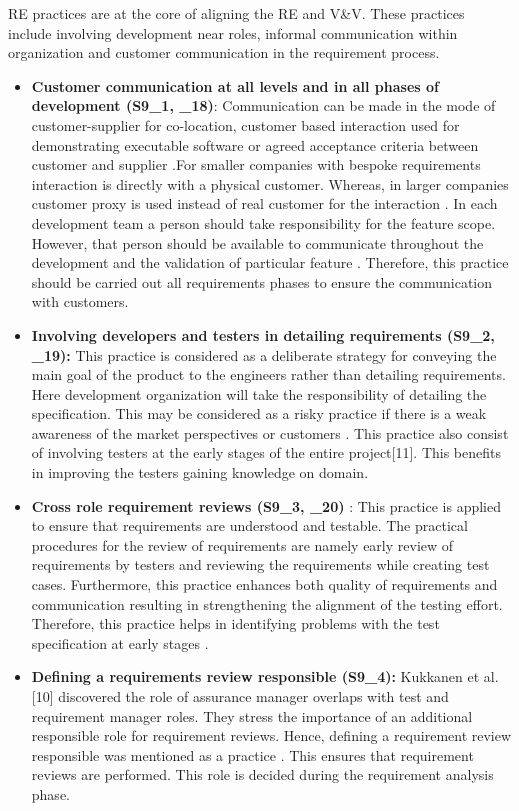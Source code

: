 \documentclass{article}
\begin{document}
RE practices are at the core of aligning the RE and V\&V\cite{bjarnason2014challenges}. These practices include involving development near roles, informal communication within organization and customer communication in the requirement process.

\begin{itemize}
    \item \textbf{Customer communication at all levels and in all phases of development (S9\_1, \cite{bjarnason2014alignment}\_18)}: Communication can be made in the mode of customer-supplier for co-location, customer based interaction used for demonstrating executable software or agreed acceptance criteria between customer and supplier \cite{bjarnason2014challenges}.For smaller companies with bespoke requirements interaction is directly with a physical customer. Whereas, in larger companies customer proxy is used instead of real customer for the interaction \cite{bjarnason2014challenges}. In each development team a person should take responsibility for the feature scope. However, that person should be available to communicate throughout the development and the validation of particular feature \cite{bjarnason2014challenges}. Therefore, this practice should be carried out all requirements phases to ensure the communication with customers.
    \item \textbf{Involving developers and testers in detailing requirements (S9\_2,  \cite{bjarnason2014alignment}\_19): }
    This practice is considered as a deliberate strategy for conveying the main goal of the product to the engineers rather than detailing requirements. Here development organization will take the responsibility of detailing the specification. This may be considered as a risky practice if there is a weak awareness of the market perspectives or customers \cite{bjarnason2014challenges}. This practice also consist of involving testers at the early stages of the entire project[11]. This benefits in improving the testers gaining knowledge on domain\cite{bjarnason2014challenges}. 
    \item \textbf{Cross role requirement reviews (S9\_3, \cite{bjarnason2014alignment}\_20)} : This practice is applied to ensure that requirements are understood and testable. The practical procedures for the review of requirements are namely early review of requirements by testers and reviewing the requirements while creating test cases. Furthermore, this practice enhances both quality of requirements and communication resulting in strengthening the alignment of the testing effort. Therefore, this practice helps in identifying problems with the test specification at early stages \cite{bjarnason2014challenges}. 
    \item \textbf{Defining a requirements review responsible (S9\_4):} Kukkanen et al. [10] discovered the role of assurance manager overlaps with test and requirement manager roles. They stress the importance of an additional responsible role for requirement reviews. Hence, defining a requirement review responsible was mentioned as a practice \cite{bjarnason2014challenges}. This ensures that requirement reviews are performed. This role is decided during the requirement analysis phase.
    

\end{itemize}
\end{document}
